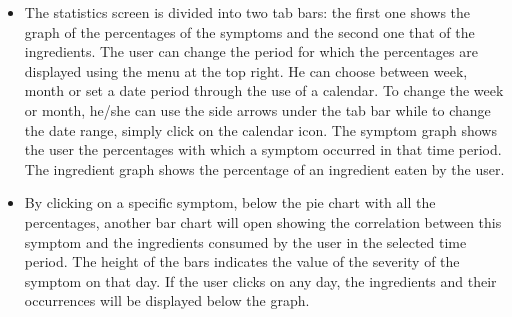 \documentclass [12pt]{article}
\begin{document}
\begin{description}[leftmargin=1cm,rightmargin=1cm]
\begin{figure}[h!]
\begin{subfigure}[tr]{0.3\linewidth}
\end{subfigure}
\hspace*{\fill}
\end{figure}
\begin{itemize}[•]
\item The statistics screen is divided into two tab bars: the first one shows the graph of the percentages of the symptoms and the second one that of the ingredients. The user can change the period for which the percentages are displayed using the menu at the top right. He can choose between week, month or set a date period through the use of a calendar. To change the week or month, he/she can use the side arrows under the tab bar while to change the date range, simply click on the calendar icon.
The symptom graph shows the user the percentages with which a symptom occurred in that time period. The ingredient graph shows the percentage of an ingredient eaten by the user.
\item By clicking on a specific symptom, below the pie chart with all the percentages, another bar chart will open showing the correlation between this symptom and the ingredients consumed by the user in the selected time period. The height of the bars indicates the value of the severity of the symptom on that day. If the user clicks on any day, the ingredients and their occurrences will be displayed below the graph.
\end{itemize}


\end{description}
\end{document}
